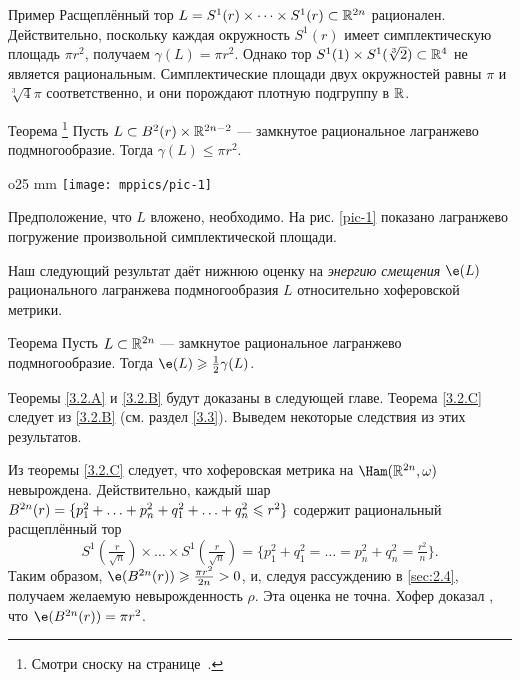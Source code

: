 \begin{ex*}{Пример}
Расщеплённый тор $L = S^1 (r) \times\dots\times S^1 (r) \subset
\mathbb{R}^{2n}$ рационален. 
Действительно, поскольку каждая окружность $S^1 (r)$ имеет
симплектическую площадь $\pi r^2$, получаем $\gamma (L) = \pi r^2$. 
Однако тор $S^1(1)\times S^1(\sqrt[3]{2}) \subset \mathbb{R}^4$ не является
рациональным.
Симплектические площади двух окружностей равны $\pi$  и
$\sqrt[3]{4}\pi$ соответственно, и они порождают плотную подгруппу в
$\mathbb{R}$.
\end{ex*}
\begin{thm}[(\cite{S1})]{Теорема}%
  \hspace{-0.6em}\footnote{Смотри сноску на
    странице~\pageref{foot:sikorav}.}
  \label{3.2.B}
  Пусть $L \subset B^2 (r) \times \mathbb{R}^{2n - 2}$ — замкнутое
  рациональное лагранжево подмногообразие. 
  Тогда $\gamma (L) \le \pi r^2$.
\end{thm}

\begin{wrapfigure}[7]{o}{25 mm}
\vskip-3mm
\centering
\texttt{[image: mppics/pic-1]}
\caption{}\label{pic-1}
\vskip0mm
\end{wrapfigure}

Предположение, что $L$ вложено, необходимо.
На рис. \ref{pic-1} показано лагранжево погружение произвольной
симплектической площади.

Наш следующий результат даёт нижнюю оценку на \emph{энергию смещения} $\e (L)$ рационального лагранжева подмногообразия $L$ относительно хоферовской метрики.

\begin{thm}{Теорема}\label{3.2.C}
  Пусть $L \subset \mathbb{R}^{2n}$ — замкнутое рациональное лагранжево
  подмногообразие.
  Тогда $\e (L) \ge \tfrac12 \gamma (L)$.
\end{thm}

Теоремы \ref{3.2.A} и \ref{3.2.B} будут доказаны в следующей главе.
Теорема \ref{3.2.C} следует из \ref{3.2.B} (см. раздел \ref{3.3}).
Выведем некоторые следствия из этих результатов.

\begin{ex}{}\label{3.2.D}
Из теоремы \ref{3.2.C} следует, что хоферовская метрика на $\Ham (\RR^{2n}, \omega)$ невырождена.
Действительно, каждый шар 
$B^{2n}(r) = \{p_1^2 +\z\dots\z+ p_n^2 \z+ q_1^2+\z\dots\z+ q_n^2 \le r^2\}$
содержит рациональный расщеплённый тор 
\[
S^1(\tfrac r{\sqrt{n}}) \times\dots\times S^1(\tfrac r{\sqrt{n}})
=
\{p_1^{2}+q_1^2=\dots=p_n^{2}+q_n^2=\tfrac{r^2}{n}\}.
\]
Таким образом, $\e (B^{2n} (r)) \ge \tfrac{\pi r^2}{2n}> 0$, и, следуя рассуждению в \ref{sec:2.4}, получаем желаемую невырожденность $\rho$.
Эта оценка не точна.
Хофер доказал \cite{H1}, что $\e (B^{2n} (r)) = \pi r^2$.
\end{ex}

